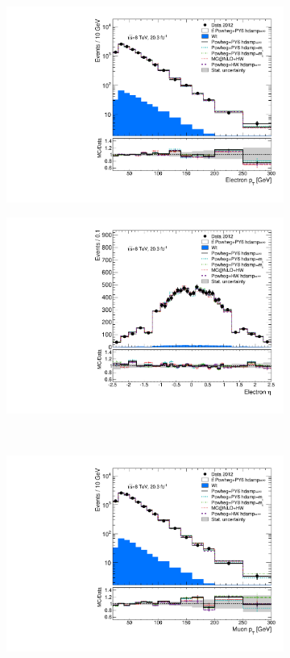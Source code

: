 \begin{figure}[htp]
\centering
\begin{subfigure}[]{0.45\textwidth}
\includegraphics[width=\textwidth]{fig/MCComp/NLO/ElecPt.pdf}
\end{subfigure}
\begin{subfigure}[]{0.45\textwidth}
\includegraphics[width=\textwidth]{fig/MCComp/NLO/ElecEta.pdf}
\end{subfigure}
\\
\begin{subfigure}[]{0.45\textwidth}
\includegraphics[width=\textwidth]{fig/MCComp/NLO/MuPt.pdf}

\end{subfigure}
\end{figure}
